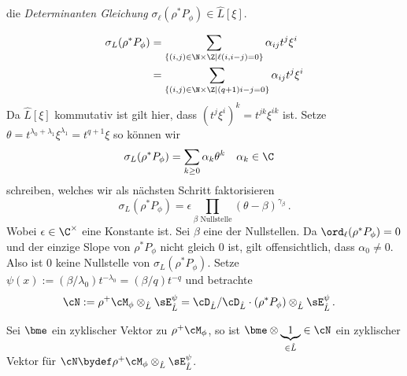 die \emph{Determinanten Gleichung} $\sigma_\ell(\rho^*P_{\phi})\in \hat L[\xi]$.
\begin{comment}
Schon gezeigt, das $ord_\ell = 0$?
\end{comment}
\begin{align*}
\sigma_L(\rho^*P_{\phi})
  &= \sum_{\{(i,j)\in\N\times\Z \mid \ell(i,i-j)=0\}}\alpha_{ij}t^j\xi^i\\
  &= \sum_{\{(i,j)\in\N\times\Z \mid (q+1)i-j=0\}}\alpha_{ij}t^j\xi^i
\end{align*}
Da $\hat L[\xi]$ kommutativ ist gilt hier, dass $(t^j\xi^i)^k=t^{jk}\xi^{ik}$ ist.
Setze $\theta=t^{\lambda_0+\lambda_1}\xi^{\lambda_1}=t^{q+1}\xi$ so können wir
\begin{align*}
\sigma_L(\rho^*P_{\phi}) &= \sum_{k\geq 0}\alpha_k\theta^k & & \alpha_k\in\C
\end{align*}
schreiben, welches wir als nächsten Schritt faktorisieren
\[
\sigma_L(\rho^*P_\phi)
  =\epsilon\prod_{\beta\mbox{ Nullstelle}}(\theta-\beta)^{\gamma_\beta}\,.
\]
Wobei $\epsilon\in\C^\times$ eine Konstante ist.
Sei $\beta$  eine der Nullstellen.
Da $\ord_\ell(\rho^*P_\phi)=0$ und der einzige Slope von $\rho^*P_\phi$ nicht
gleich $0$ ist, gilt offensichtlich, dass $\alpha_0\neq0$. Also ist $0$ keine
Nullstelle von $\sigma_L(\rho^*P_\phi)$.
Setze $\psi(x):=(\beta/\lambda_0)t^{-\lambda_0}=(\beta/q)t^{-q}$ und
betrachte
\begin{align*}
\cN:=\rho^+\cM_\phi\otimes_{\hat L}\sE_{\hat L}^\psi
  &= \cD_{\hat L}/\cD_{\hat L}\cdot(\rho^*P_{\phi})
    \otimes_{\hat L}\sE_{\hat L}^\psi \,.
\end{align*}
\begin{lem}
Sei $\bme$ ein zyklischer Vektor zu $\rho^+\cM_\phi$, so ist $\bme\otimes
\underset{\in\hat L}{\underbrace{1}}\in\cN$ ein zyklischer Vektor für
$\cN\bydef\rho^+\cM_\phi\otimes_{\hat L}\sE_{\hat L}^\psi$.
\end{lem}
